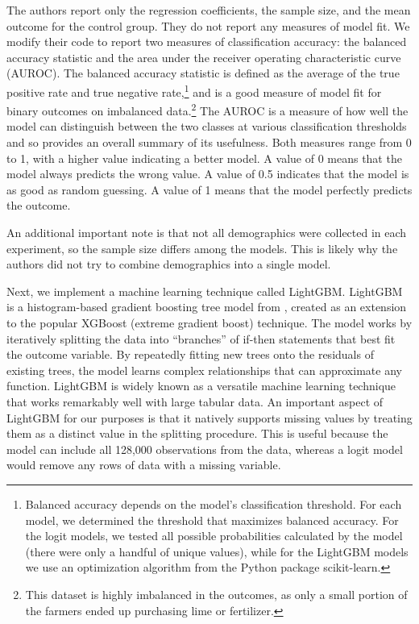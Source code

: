 \documentclass[12pt]{article}
\begin{document}
The authors report only the regression coefficients, the sample size, and the mean outcome for the control group. They do not report any measures of model fit. We modify their code to report two measures of classification accuracy: the balanced accuracy statistic and the area under the receiver operating characteristic curve (AUROC). The balanced accuracy statistic is defined as the average of the true positive rate and true negative rate,\footnote{Balanced accuracy depends on the model's classification threshold. For each model, we determined the threshold that maximizes balanced accuracy. For the logit models, we tested all possible probabilities calculated by the model (there were only a handful of unique values), while for the LightGBM models we use an optimization algorithm from the Python package \textsf{scikit-learn}.} and is a good measure of model fit for binary outcomes on imbalanced data.\footnote{This dataset is highly imbalanced in the outcomes, as only a small portion of the farmers ended up purchasing lime or fertilizer.} The AUROC is a measure of how well the model can distinguish between the two classes at various classification thresholds and so provides an overall summary of its usefulness. Both measures range from 0 to 1, with a higher value indicating a better model. A value of 0 means that the model always predicts the wrong value. A value of 0.5 indicates that the model is as good as random guessing. A value of 1 means that the model perfectly predicts the outcome.

An additional important note is that not all demographics were collected in each experiment, so the sample size differs among the models. This is likely why the authors did not try to combine demographics into a single model.

Next, we implement a machine learning technique called LightGBM. LightGBM is a histogram-based gradient boosting tree model from \textcite{ke_lightgbm_2017}, created as an extension to the popular XGBoost (extreme gradient boost) technique. The model works by iteratively splitting the data into ``branches'' of if-then statements that best fit the outcome variable. By repeatedly fitting new trees onto the residuals of existing trees, the model learns complex relationships that can approximate any function. LightGBM is widely known as a versatile machine learning technique that works remarkably well with large tabular data. An important aspect of LightGBM for our purposes is that it natively supports missing values by treating them as a distinct value in the splitting procedure. This is useful because the model can include all 128,000 observations from the data, whereas a logit model would remove any rows of data with a missing variable.
\end{document}
